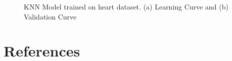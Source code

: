 \documentclass[
	letterpaper, %
]{mlreport}
\begin{document}
\begin{figure}
	\centering
	\caption{KNN Model trained on heart dataset. (a) Learning Curve and (b) Validation Curve}
	\label{fig:fig13}
\end{figure}





\newpage

\section{References}
\printbibliography
\end{document}
